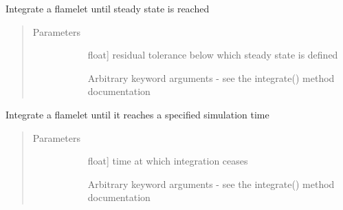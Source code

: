 \documentclass[letterpaper,10pt,english]{sphinxmanual}
\begin{document}
\begin{fulllineitems}
\begin{fulllineitems}
\label{\detokenize{spitfire.chemistry.general_diff_rxn:spitfire.chemistry.general_diff_rxn.DiffusionReaction1D_FiniteDifference.integrate_to_steady}}
Integrate a flamelet until steady state is reached
\begin{quote}\begin{description}
\item[{Parameters}] \leavevmode\begin{description}
\item[{}] \leavevmode{[}float{]}
residual tolerance below which steady state is defined

\item[{}] \leavevmode
Arbitrary keyword arguments - see the integrate() method documentation

\end{description}

\end{description}\end{quote}

\end{fulllineitems}


\begin{fulllineitems}
\label{\detokenize{spitfire.chemistry.general_diff_rxn:spitfire.chemistry.general_diff_rxn.DiffusionReaction1D_FiniteDifference.integrate_to_time}}
Integrate a flamelet until it reaches a specified simulation time
\begin{quote}\begin{description}
\item[{Parameters}] \leavevmode\begin{description}
\item[{}] \leavevmode{[}float{]}
time at which integration ceases

\item[{}] \leavevmode
Arbitrary keyword arguments - see the integrate() method documentation


\end{description}
\end{description}
\end{quote}
\end{fulllineitems}
\end{fulllineitems}
\end{document}
